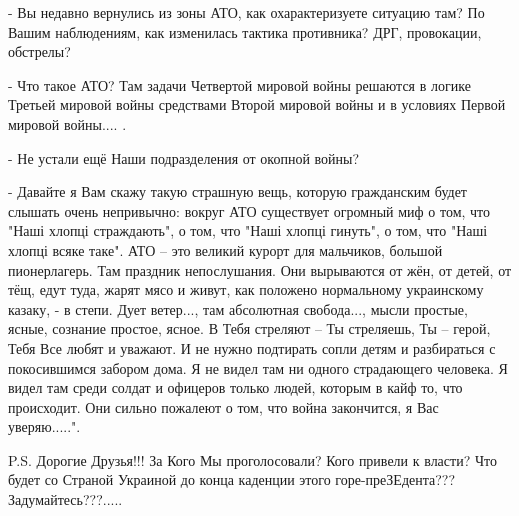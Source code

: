 - Вы недавно вернулись из зоны АТО, как охарактеризуете ситуацию там? По Вашим
наблюдениям, как изменилась тактика противника? ДРГ, провокации, обстрелы?

- Что такое АТО? Там задачи Четвертой мировой войны решаются в логике Третьей
мировой войны средствами Второй мировой войны и в условиях Первой мировой
войны.... .

- Не устали ещё Наши подразделения от окопной войны?

- Давайте я Вам скажу такую страшную вещь, которую гражданским будет слышать
очень непривычно: вокруг АТО существует огромный миф о том, что "Наші хлопці
страждають", о том, что "Наші хлопці гинуть", о том, что "Наші хлопці всяке
таке". АТО – это великий курорт для мальчиков, большой пионерлагерь. Там
праздник непослушания. Они вырываются от жён, от детей, от тёщ, едут туда,
жарят мясо и живут, как положено нормальному украинскому казаку, - в степи.
Дует ветер..., там абсолютная свобода..., мысли простые, ясные, сознание
простое, ясное. В Тебя стреляют – Ты стреляешь, Ты – герой, Тебя Все любят и
уважают. И не нужно подтирать сопли детям и разбираться с покосившимся забором
дома. Я не видел там ни одного страдающего человека. Я видел там среди солдат и
офицеров только людей, которым в кайф то, что происходит. Они сильно пожалеют о
том, что война закончится, я Вас уверяю.....".         

P.S. Дорогие Друзья!!! За Кого Мы проголосовали? Кого привели к власти? Что
будет со Страной Украиной до конца каденции этого горе-преЗЕдента???
Задумайтесь???.....
